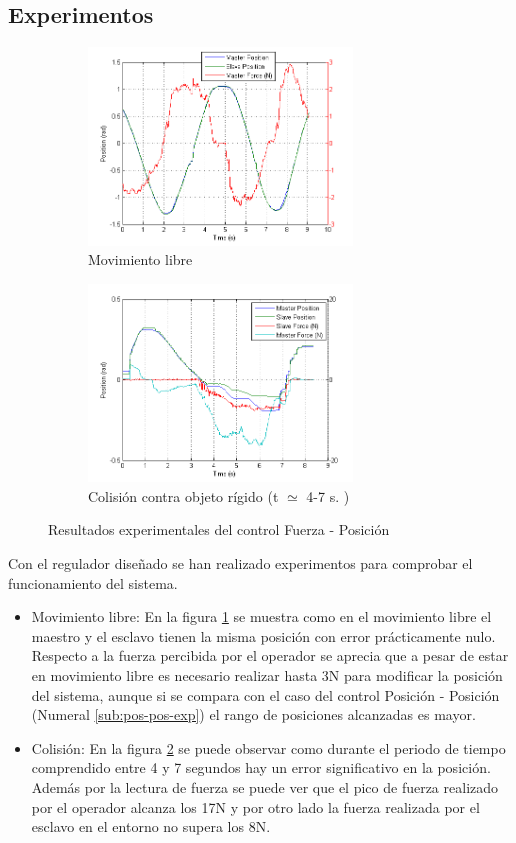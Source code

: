 \subsection{Experimentos}
\label{sub:force-pos-exp}
\begin{figure}[htbp]
\centering
	\begin{subfigure}[h]
		\centering
		\includegraphics[height=5.25cm]{force-pos-exp-libre}
		\caption{Movimiento libre}
		\label{fig:force-pos-exp-libre}
	\end{subfigure}
	\begin{subfigure}[h]
		\centering
		\includegraphics[height=5.25cm]{force-pos-exp-env}
		\caption{Colisión contra objeto rígido (t $\simeq$ 4-7 s. )}
		\label{fig:force-pos-exp-env}
	\end{subfigure}
	\caption{Resultados experimentales del control Fuerza - Posición}
  	\label{fig:force-pos-exp}
\end{figure}

Con el regulador diseñado se han realizado experimentos para comprobar el funcionamiento del sistema.
\begin{itemize}
\item Movimiento libre: En la figura \ref{fig:force-pos-exp-libre} se muestra como en el movimiento libre el maestro y el esclavo tienen la misma posición con error prácticamente nulo. Respecto a la fuerza percibida por el operador se aprecia que a pesar de estar en movimiento libre es necesario realizar hasta 3N para modificar la posición del sistema, aunque si se compara con el caso del control Posición - Posición (Numeral \ref{sub:pos-pos-exp}) el rango de posiciones alcanzadas es mayor.
\item Colisión: En la figura \ref{fig:force-pos-exp-env} se puede observar como durante el periodo de tiempo comprendido entre 4 y 7 segundos hay un error significativo en la posición. Además por la lectura de fuerza se puede ver que el pico de fuerza realizado por el operador alcanza los 17N y por otro lado la fuerza realizada por el esclavo en el entorno no supera los 8N.
\end{itemize}

